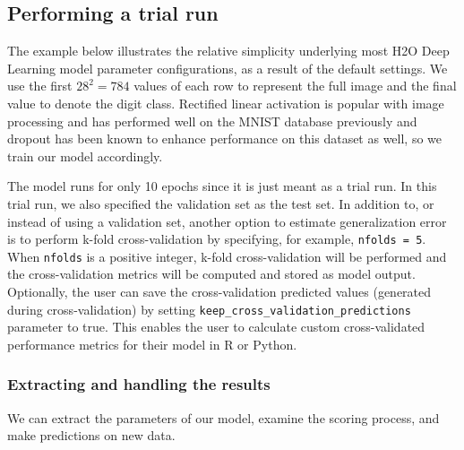 \waterExampleInPython


\subsection{Performing a trial run}
\label{ssec:TrialRun} 
The example below illustrates the relative simplicity underlying most H2O Deep Learning model parameter configurations, as a result of the default settings. We use the first $28^2 = 784$ values of each row to represent the full image and the final value to denote the digit class. Rectified linear activation is popular with image processing and has performed well on the MNIST database previously and dropout has been known to enhance performance on this dataset as well, so we train our model accordingly. 

\newpage
\waterExampleInR


\waterExampleInPython



\noindent
The model runs for only 10 epochs since it is just meant  as a trial run. In this trial run, we also specified the validation set as the test set.  In addition to, or instead of using a validation set, another option to estimate generalization error is to perform k-fold cross-validation by specifying, for example, \texttt{nfolds = 5}.  When \texttt{nfolds} is a positive integer, k-fold cross-validation will be performed and the cross-validation metrics will be computed and stored as model output.  Optionally, the user can save the cross-validation predicted values (generated during cross-validation) by setting \texttt{keep\_cross\_validation\_predictions} parameter to true.  This enables the user to calculate custom cross-validated performance metrics for their model in R or Python.  

\subsubsection{Extracting and handling the results} 

We can extract the parameters of our model, examine the scoring process, and make predictions on new data.
\newpage
\waterExampleInR


\waterExampleInPython



